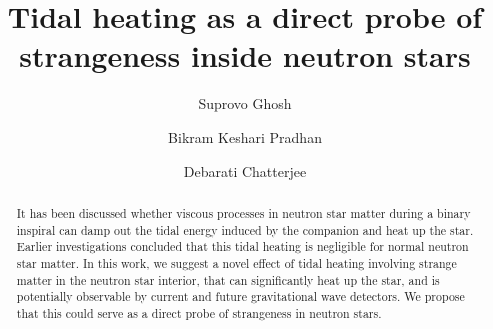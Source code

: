 \documentclass[%
 reprint,
 amsmath,amssymb,
 aps,
]{revtex4-2}
\begin{document}

\title{Tidal heating as a direct probe of strangeness inside neutron stars}%

\author{Suprovo Ghosh}
\author{Bikram Keshari Pradhan}
\author{Debarati Chatterjee}%
%


\newcommand{\sg}[1]{\textsf{\color{red}{ #1}}}
\newcommand{\dc}[1]{\textsf{\color{red}{ #1}}}
\newcommand{\bkp}[1]{\textsf{\color{green}{ #1}}}

\begin{abstract}
It has been discussed whether viscous processes in neutron star matter during a binary inspiral can damp out the tidal energy induced by the companion and heat up the star. Earlier investigations concluded that this tidal heating is negligible for normal neutron star matter. In this work, we suggest a novel effect of tidal heating involving strange matter in the neutron star interior, that can significantly heat up the star, and is potentially observable by current and future gravitational wave detectors. We propose that this could serve as a direct probe of strangeness in neutron stars.

\end{abstract}
\end{document}
